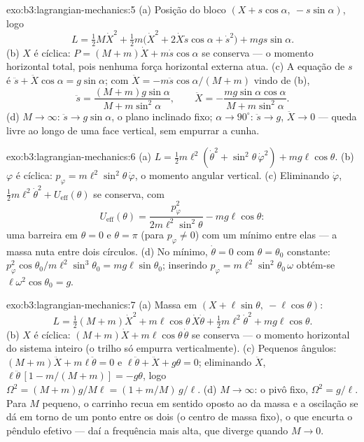 \begin{solution}{exo:b3:lagrangian-mechanics:5}
(a) Posição do bloco $(X + s\cos\alpha,\ -s\sin\alpha)$, logo
\[
L = \tfrac12 M\dot X^2 + \tfrac12 m\big(\dot X^2 +
2\dot X\dot s\cos\alpha + \dot s^2\big) + mgs\sin\alpha .
\]
(b) $X$ é cíclica: $P = (M + m)\dot X + m\dot s\cos\alpha$ se conserva
--- o momento horizontal total, pois nenhuma força horizontal externa
atua. (c) A equação de $s$ é $\ddot s + \ddot
X\cos\alpha = g\sin\alpha$; com $\ddot X = -m\ddot s\cos\alpha/(M +
m)$ vindo de (b),
\[
\ddot s = \frac{(M + m)g\sin\alpha}{M + m\sin^2\alpha} , \qquad
\ddot X = -\frac{mg\sin\alpha\cos\alpha}{M + m\sin^2\alpha} .
\]
(d) $M \to \infty$: $\ddot s \to g\sin\alpha$, o plano inclinado fixo;
$\alpha \to 90^\circ$: $\ddot s \to g$, $\ddot X \to 0$ --- queda livre
ao longo de uma face vertical, sem empurrar a cunha.
\end{solution}

\begin{solution}{exo:b3:lagrangian-mechanics:6}
(a) $L = \tfrac12 m\ell^2(\dot\theta^2 + \sin^2\theta\,\dot\varphi^2) +
mg\ell\cos\theta$. (b) $\varphi$ é cíclica: $p_\varphi =
m\ell^2\sin^2\theta\,\dot\varphi$, o momento angular vertical. (c)
Eliminando $\dot\varphi$, $\tfrac12 m\ell^2\dot\theta^2 +
U_{\text{eff}}(\theta)$ se conserva, com
\[
U_{\text{eff}}(\theta) = \frac{p_\varphi^2}{2m\ell^2\sin^2\theta}
 - mg\ell\cos\theta :
\]
uma barreira em $\theta = 0$ e $\theta = \pi$ (para $p_\varphi \neq 0$)
com um mínimo entre elas --- a massa nuta entre dois círculos. (d) No
mínimo, $\dot\theta = 0$ com $\theta = \theta_0$ constante:
$p_\varphi^2\cos\theta_0/m\ell^2\sin^3\theta_0 = mg\ell\sin\theta_0$;
inserindo $p_\varphi = m\ell^2\sin^2\theta_0\,\omega$ obtém-se
$\ell\omega^2\cos\theta_0 = g$.
\end{solution}

\begin{solution}{exo:b3:lagrangian-mechanics:7}
(a) Massa em $(X + \ell\sin\theta,\ -\ell\cos\theta)$:
\[
L = \tfrac12(M + m)\dot X^2 + m\ell\cos\theta\,\dot X\dot\theta
 + \tfrac12 m\ell^2\dot\theta^2 + mg\ell\cos\theta .
\]
(b) $X$ é cíclica: $(M + m)\dot X + m\ell\cos\theta\,\dot\theta$ se
conserva --- o momento horizontal do sistema inteiro (o trilho só
empurra verticalmente). (c) Pequenos ângulos: $(M + m)\ddot X +
m\ell\ddot\theta = 0$ e $\ell\ddot\theta + \ddot X + g\theta = 0$;
eliminando $\ddot X$, $\ell\ddot\theta\,[1 - m/(M + m)] = -g\theta$,
logo $\Omega^2 = (M + m)g/M\ell = (1 + m/M)\,g/\ell$. (d) $M \to \infty$:
o pivô fixo, $\Omega^2 = g/\ell$. Para $M$ pequeno, o carrinho recua em
sentido oposto ao da massa e a oscilação se dá em torno de um ponto
entre os dois (o centro de massa fixo), o que encurta o pêndulo efetivo
--- daí a frequência mais alta, que diverge quando $M \to 0$.
\end{solution}

